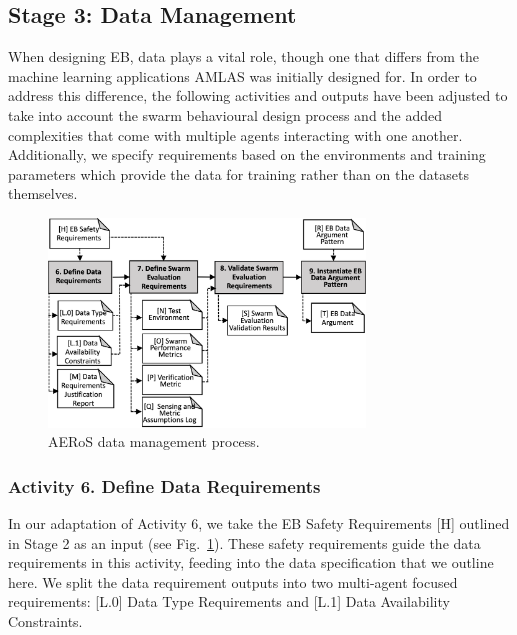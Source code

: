 \documentclass[runningheads]{llncs}
\begin{document}
\vspace{-2ex}
\subsection{Stage 3: Data Management} \label{framework-stage3}
When designing EB, data plays a vital role, though one that differs from the machine learning applications AMLAS was initially designed for. In order to address this difference, the following activities and outputs have been adjusted to take into account the swarm behavioural design process and the added complexities that come with multiple agents interacting with one another. Additionally, we specify requirements based on the environments and training parameters which provide the data for training rather than on the datasets themselves.

\begin{figure}
\centering
\includegraphics[width=0.75\textwidth]{figures/AMLAS-STAGE-3-V4.png}
\vspace{-2ex}
\caption{AERoS data management process.}
\label{amlas-a-stage3}
\vspace{-4ex}
\end{figure}

\vspace{-2ex}
\subsubsection*{Activity 6. Define Data Requirements}
In our adaptation of Activity 6, we take the EB Safety Requirements [H] outlined in Stage 2 as an input (see Fig.~\ref{amlas-a-stage3}). These safety requirements guide the data requirements in this activity, feeding into the data specification that we outline here. We split the data requirement outputs into two multi-agent focused requirements: [L.0] Data Type Requirements and [L.1] Data Availability Constraints.
\end{document}
